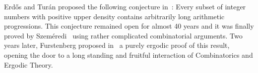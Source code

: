 Erd\H{o}s and Turán proposed the following conjecture in~\cite{ErdosTuranSeqIntegers}: Every subset of integer numbers with positive upper density contains arbitrarily long arithmetic progressions. This conjecture remained open for almost 40 years and it was finally proved by Szeméredi~\cite{SzemerediSetsIntContNoKElemArithProg} using rather complicated combinatorial arguments. Two years later, Furstenberg proposed in~\cite{FurstenbergErgBehavDiagMeasSzemeredi} a purely ergodic proof of this result, opening the door to a long standing and fruitful interaction of Combinatorics and Ergodic Theory.
